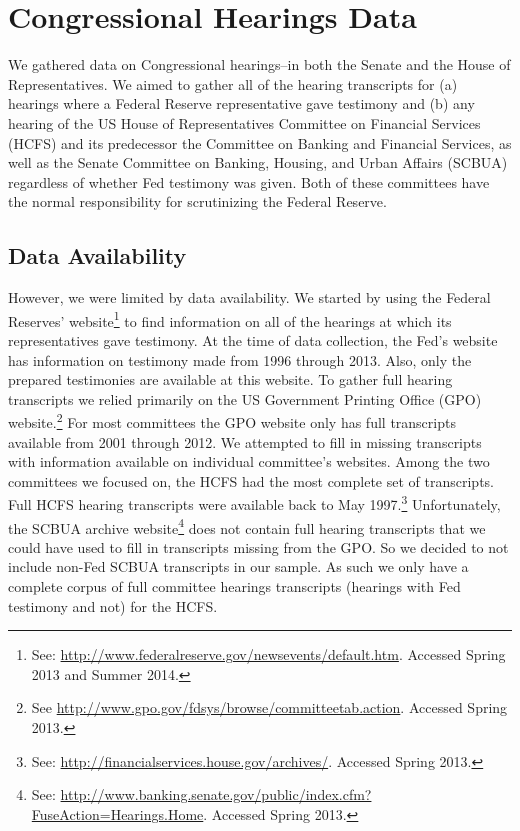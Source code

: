 \documentclass[a4paper]{article}\usepackage[]{graphicx}\usepackage[]{color}
\begin{document}
\section{Congressional Hearings Data}

We gathered data on Congressional hearings--in both the Senate and the House of Representatives. We aimed to gather all of the hearing transcripts for (a) hearings where a Federal Reserve representative gave testimony and (b) any hearing of the US House of Representatives Committee on Financial Services (HCFS) and its predecessor the Committee on Banking and Financial Services, as well as the Senate Committee on Banking, Housing, and Urban Affairs (SCBUA) regardless of whether Fed testimony was given. Both of these committees have the normal responsibility for scrutinizing the Federal Reserve.

\subsection{Data Availability}

However, we were limited by data availability. We started by using the Federal Reserves' website\footnote{See: \url{http://www.federalreserve.gov/newsevents/default.htm}. Accessed Spring 2013 and Summer 2014.} to find information on all of the hearings at which its representatives gave testimony. At the time of data collection, the Fed's website has information on testimony made from 1996 through 2013. Also, only the prepared testimonies are available at this website. To gather full hearing transcripts we relied primarily on the US Government Printing Office (GPO) website.\footnote{See \url{http://www.gpo.gov/fdsys/browse/committeetab.action}. Accessed Spring 2013.} For most committees the GPO website only has full transcripts available from 2001 through 2012. We attempted to fill in missing transcripts with information available on individual committee's websites. Among the two committees we focused on, the HCFS had the most complete set of transcripts. Full HCFS hearing transcripts were available back to May 1997.\footnote{See: \url{http://financialservices.house.gov/archives/}. Accessed Spring 2013.} Unfortunately, the SCBUA archive website\footnote{See: \url{http://www.banking.senate.gov/public/index.cfm?FuseAction=Hearings.Home}. Accessed Spring 2013.} does not contain full hearing transcripts that we could have used to fill in transcripts missing from the GPO. So we decided to not include non-Fed SCBUA transcripts in our sample. As such we only have a complete corpus of full committee hearings transcripts (hearings with Fed testimony and not) for the HCFS.
\end{document}
